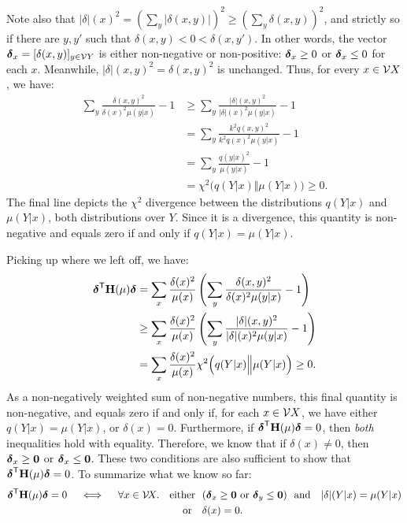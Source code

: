 \begin{subappendices}
\begin{lproof}
    Note also that $|\delta|(x)^2 = (\sum_{y} |\delta(x,y)|)^2 \ge (\sum_{y} \delta(x,y))^2$, and strictly so if there are $y,y'$ such that $\delta(x,y) < 0 < \delta(x,y')$.
    In other words, the vector ${\boldsymbol\delta}_x = [\delta(x,y)]_{y \in \mathcal V Y}$ is either non-negative or non-positive: ${\boldsymbol\delta}_x \ge 0$ or ${\boldsymbol\delta}_x \le 0$ for each $x$.
     Meanwhile, $|\delta|(x,y)^2 = \delta(x,y)^2$ is unchanged.
    Thus, for every $x \in \mathcal V X$, we have:
    \begin{align*}
        \sum_y \frac{\delta(x,y)^2}{\delta(x)^2 \mu(y|x)} - 1
        &\ge \sum_y \frac{|\delta|(x,y)^2}{|\delta|(x)^2 \mu(y|x)} - 1 \\
        &= \sum_y \frac{k^2 q(x,y)^2}{k^2 q(x)^2 \mu(y|x)} - 1 \\
        &= \sum_y \frac{ q(y|x)^2}{\mu(y|x)} - 1   \\
        &= \chi^2 \Big( q(Y|x) \Big\Vert  \mu(Y|x) \Big) \ge 0.
    \end{align*}
    The final line depicts the $\chi^2$ divergence between the distributions $q(Y|x)$ and $\mu(Y|x)$, both distributions over $Y$.  Since it is a divergence, this quantity is non-negative and equals zero if and only if $q(Y|x)=\mu(Y|x)$.

    Picking up where we left off, we have:
    \begin{align*}
        {\boldsymbol\delta}^{\sf T} \mathbf H(\mu) {\boldsymbol\delta}
            &= \sum_{x} \frac{\delta(x)^2}{\mu(x)} \left( \sum_y \frac{\delta(x,y)^2}{\delta(x)^2 \mu(y|x)} - 1 \right) \\
            &\ge \sum_{x} \frac{\delta(x)^2}{\mu(x)} \left( \sum_y \frac{|\delta|(x,y)^2}{|\delta|(x)^2 \mu(y|x)} - 1 \right) \\
            &=
            \sum_{x} \frac{\delta(x)^2}{\mu(x)}
            \chi^2 \Big( q(Y|x) \Big\Vert  \mu(Y|x) \Big) \ge 0.
    \end{align*}
    As a non-negatively weighted sum of non-negative numbers, this final quantity is non-negative, and equals zero if and only if, for each $x \in \mathcal V X$, we have either $q(Y|x) = \mu(Y|x)$, or $\delta(x) = 0$.
    Furthermore, if ${\boldsymbol\delta}^{\sf T} \mathbf H(\mu) {\boldsymbol\delta} = 0$, then \emph{both} inequalities hold with equality. Therefore, we know that if $\delta(x) \ne 0$, then ${\boldsymbol\delta}_x \ge \mathbf 0$ or ${\boldsymbol\delta}_x \le \mathbf 0$.
    These two conditions are also sufficient to show that ${\boldsymbol\delta}^{\sf T} \mathbf H(\mu) {\boldsymbol\delta} = 0$.
    To summarize what we know so far:
    \begin{align*}
        {\boldsymbol\delta}^{\sf T} \mathbf H(\mu) {\boldsymbol\delta} = 0
            \quad\iff\quad\forall x \in \mathcal V\!X.\quad
                \text{either}&~~  ({\boldsymbol\delta}_x \ge \mathbf 0 \text{ or } {\boldsymbol\delta}_y \le \mathbf 0) \text{~~and~~ $|\delta|(Y|x) = \mu(Y|x) $}\\
                \text{or }&~~ \delta(x) = 0.
    \end{align*}


\end{lproof}
\end{subappendices}
